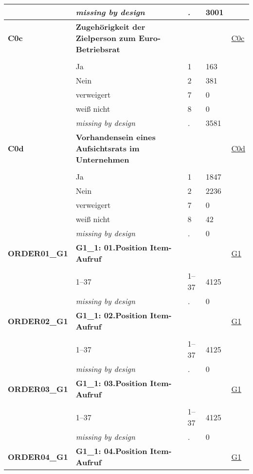 \begin{longtable}{| L{2.65cm} | L{8cm} | C{1.5cm} | R{1.25cm} | C{2.25cm}  |}
   & \textit{missing by design} & \textit{.} & 3001 &  \\ 
   \midrule
\textbf{C0c}\label{var:C0c} & \textbf{Zugehörigkeit der Zielperson zum Euro-Betriebsrat} &  &  & \hyperref[C0c]{C0c} \\ 
   &  &  &  &  \\ 
   & Ja & 1 & 163 &  \\ 
   & Nein & 2 & 381 &  \\ 
   & verweigert & 7 & 0 &  \\ 
   & weiß nicht & 8 & 0 &  \\ 
   & \textit{missing by design} & \textit{.} & 3581 &  \\ 
   \midrule
\textbf{C0d}\label{var:C0d} & \textbf{Vorhandensein eines Aufsichtsrats im Unternehmen} &  &  & \hyperref[C0d]{C0d} \\ 
   &  &  &  &  \\ 
   & Ja & 1 & 1847 &  \\ 
   & Nein & 2 & 2236 &  \\ 
   & verweigert & 7 & 0 &  \\ 
   & weiß nicht & 8 & 42 &  \\ 
   & \textit{missing by design} & \textit{.} & 0 &  \\ 
   \midrule
\textbf{ORDER01\_G1}\label{var:ORDER01:G1} & \textbf{G1\_1: 01.Position Item-Aufruf} &  &  & \hyperref[G1]{G1} \\ 
   &  &  &  &  \\ 
   & 1--37 & 1--37 & 4125 &  \\ 
   & \textit{missing by design} & \textit{.} & 0 &  \\ 
   \midrule
\textbf{ORDER02\_G1}\label{var:ORDER02:G1} & \textbf{G1\_1: 02.Position Item-Aufruf} &  &  & \hyperref[G1]{G1} \\ 
   &  &  &  &  \\ 
   & 1--37 & 1--37 & 4125 &  \\ 
   & \textit{missing by design} & \textit{.} & 0 &  \\ 
   \midrule
\textbf{ORDER03\_G1}\label{var:ORDER03:G1} & \textbf{G1\_1: 03.Position Item-Aufruf} &  &  & \hyperref[G1]{G1} \\ 
   &  &  &  &  \\ 
   & 1--37 & 1--37 & 4125 &  \\ 
   & \textit{missing by design} & \textit{.} & 0 &  \\ 
   \midrule
\textbf{ORDER04\_G1}\label{var:ORDER04:G1} & \textbf{G1\_1: 04.Position Item-Aufruf} &  &  & \hyperref[G1]{G1} \\ 

\end{longtable}
